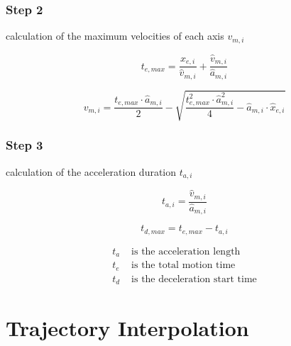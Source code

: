 \documentclass[%
  professionalfonts,%
  xcolor={%
    usenames,%
    dvipsnames,%
    svgnames,%
    table,%
    hyperref%
  }%
]{beamer}
\begin{document}
\subsubsection{Step 2}
\begin{frame}
calculation of the maximum velocities of each axis $v_{m,i}$

\begin{equation*}
t_{e,max} = \frac{\hat{x}_{e,i}}{\hat{v}_{m,i}}+\frac{\hat{v}_{m,i}}{\hat{a}_{m,i}}
\end{equation*}


\begin{equation*}
v_{m,i} = \frac{t_{e,max} \cdot \hat{a}_{m,i}}{2}-\sqrt{\frac{t_{e,max}^2 \cdot \hat{a}_{m,i}^2}{4}-\hat{a}_{m,i}\cdot \hat{x}_{e,i}}
\end{equation*}
\end{frame}
  
\subsubsection{Step 3}
\begin{frame}
calculation of the acceleration duration $t_{a,i}$

\begin{equation*}
t_{a,i} = \frac{\hat{v}_{m,i}}{\hat{a}_{m,i}}
\end{equation*}

\begin{equation}
t_{d,max} = t_{e,max}-t_{a,i}
\end{equation}      

\begin{align*}
t_{a} & \text{ is the acceleration length} \\
t_{e} & \text{ is the total motion time} \\
t_{d} & \text{ is the deceleration start time}
\end{align*}
\end{frame}

\section{Trajectory Interpolation}
\end{document}
